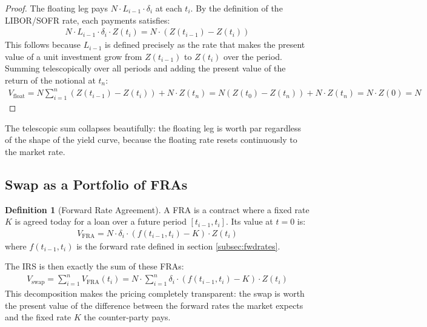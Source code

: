 \documentclass{article}
\theoremstyle{definition}  %
\newtheorem{definition}{Definition}[section]
\theoremstyle{plain}  %
\numberwithin{definition}{section}
\numberwithin{proposition}{section}
\numberwithin{theorem}{section}
\numberwithin{equation}{section}
\begin{document}
\begin{proof}
    The floating leg pays $N \cdot L_{i - 1} \cdot \delta_{i}$ at each $t_{i}$. By the definition of the LIBOR/SOFR rate, each payments satisfies:
    \begin{align*}
        N \cdot L_{i - 1} \cdot \delta_{i} \cdot Z(t_{i}) = N \cdot (Z(t_{i - 1}) - Z(t_{i}))
    \end{align*}
    This follows because $L_{i - 1}$ is defined precisely as the rate that makes the present value of a unit investment grow from $Z(t_{i - 1})$ to $Z(t_{i})$ over the period. Summing telescopically over all periods and adding the present value of the return of the notional at $t_{n}$:
    \begin{align*}
        V_{\text{float}} = N \sum_{i = 1}^{n} (Z(t_{i - 1}) - Z(t_{i})) + N \cdot Z(t_{n}) = N (Z(t_{0}) - Z(t_{n})) + N \cdot Z(t_{n}) = N \cdot Z(0) = N
    \end{align*}
\end{proof}
The telescopic sum collapses beautifully: the floating leg is worth par regardless of the shape of the yield curve, because the floating rate resets continuously to the market rate.

\subsection{Swap as a Portfolio of FRAs}
\label{subsec:swapfras}

\begin{definition}[Forward Rate Agreement]
    A FRA is a contract where a fixed rate $K$ is agreed today for a loan over a future period $[t_{i - 1}, t_{i}]$. Its value at $t = 0$ is:
    \begin{align*}
        V_{\text{FRA}} = N \cdot \delta_{i} \cdot (f(t_{i - 1}, t_{i}) - K) \cdot Z(t_{i})
    \end{align*}
    where $f(t_{i - 1}, t_{i})$ is the forward rate defined in section \ref{subsec:fwdrates}.
\end{definition}

The IRS is then exactly the sum of these FRAs:
\begin{align*}
    \boxed{
    V_{\text{swap}} = \sum_{i = 1}^{n} V_{\text{FRA}} (t_{i}) = N \cdot \sum_{i = 1}^{n} \delta_{i} \cdot (f(t_{i - 1}, t_{i}) - K) \cdot Z(t_{i})
    }
\end{align*}
This decomposition makes the pricing completely transparent: the swap is worth the present value of the difference between the forward rates the market expects and the fixed rate $K$ the counter-party pays.
\end{document}
